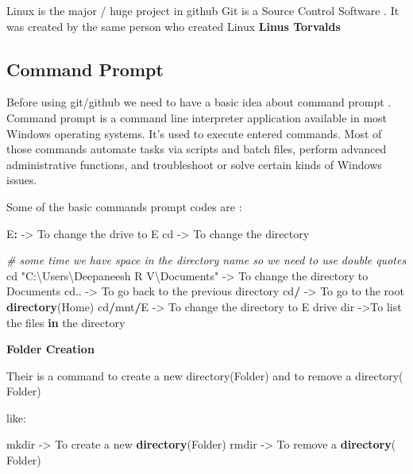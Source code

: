 \documentclass[
]{article}
\newenvironment{Shaded}{\begin{snugshade}}{\end{snugshade}}
\newcommand{\CommentTok}[1]{\textcolor[rgb]{0.56,0.35,0.01}{\textit{#1}}}
\newcommand{\ControlFlowTok}[1]{\textcolor[rgb]{0.13,0.29,0.53}{\textbf{#1}}}
\newcommand{\FunctionTok}[1]{\textcolor[rgb]{0.13,0.29,0.53}{\textbf{#1}}}
\newcommand{\NormalTok}[1]{#1}
\newcommand{\OtherTok}[1]{\textcolor[rgb]{0.56,0.35,0.01}{#1}}
\newcommand{\SpecialCharTok}[1]{\textcolor[rgb]{0.81,0.36,0.00}{\textbf{#1}}}
\newcommand{\StringTok}[1]{\textcolor[rgb]{0.31,0.60,0.02}{#1}}
\begin{document}
Linux is the major / huge project in github Git is a Source Control
Software . It was created by the same person who created Linux
\textbf{Linus Torvalds}

\subsection{Command Prompt}\label{command-prompt}

Before using git/github we need to have a basic idea about command
prompt . Command prompt is a command line interpreter application
available in most Windows operating systems. It's used to execute
entered commands. Most of those commands automate tasks via scripts and
batch files, perform advanced administrative functions, and troubleshoot
or solve certain kinds of Windows issues.

Some of the basic commands prompt codes are :

\begin{Shaded}
\begin{Highlighting}[]
\NormalTok{E}\SpecialCharTok{:} \OtherTok{{-}\textgreater{}}\NormalTok{ To change the drive to E}
\NormalTok{cd }\OtherTok{{-}\textgreater{}}\NormalTok{ To change the directory}

\CommentTok{\# some time we have space in the directory name so we need to use double quotes}
\NormalTok{cd }\StringTok{"C:\textbackslash{}Users\textbackslash{}Deepaneesh R V\textbackslash{}Documents"} \OtherTok{{-}\textgreater{}}\NormalTok{ To change the directory to Documents}
\NormalTok{cd.. }\OtherTok{{-}\textgreater{}}\NormalTok{ To go back to the previous directory}
\NormalTok{cd}\SpecialCharTok{/} \OtherTok{{-}\textgreater{}}\NormalTok{ To go to the root }\FunctionTok{directory}\NormalTok{(Home)}
\NormalTok{cd}\SpecialCharTok{/}\NormalTok{mnt}\SpecialCharTok{/}\NormalTok{E }\OtherTok{{-}\textgreater{}}\NormalTok{ To change the directory to E drive }
\NormalTok{dir }\OtherTok{{-}\textgreater{}}\NormalTok{To list the files }\ControlFlowTok{in}\NormalTok{ the directory}
\end{Highlighting}
\end{Shaded}

\textbf{Folder Creation}

Their is a command to create a new directory(Folder) and to remove a
directory( Folder)

like:

\begin{Shaded}
\begin{Highlighting}[]
\NormalTok{mkdir }\OtherTok{{-}\textgreater{}}\NormalTok{ To create a new }\FunctionTok{directory}\NormalTok{(Folder)}
\NormalTok{rmdir }\OtherTok{{-}\textgreater{}}\NormalTok{ To remove a }\FunctionTok{directory}\NormalTok{( Folder)}
\end{Highlighting}
\end{Shaded}
\end{document}
